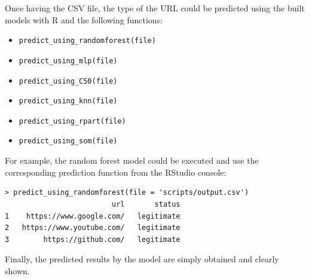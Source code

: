 \documentclass[12pt, a4paper]{article}
\begin{document}
    Once having the CSV file, the type of the URL could be predicted using the built models with R and the following functions:

    \begin{itemize}
      \item \texttt{predict\_using\_randomforest(file)}
      \item \texttt{predict\_using\_mlp(file)}
      \item \texttt{predict\_using\_C50(file)}
      \item \texttt{predict\_using\_knn(file)}
      \item \texttt{predict\_using\_rpart(file)}
      \item \texttt{predict\_using\_som(file)}
    \end{itemize}

    For example, the random forest model could be executed and use the corresponding prediction function from the RStudio console:

    \newpage

    \begin{verbatim}
> predict_using_randomforest(file = 'scripts/output.csv')
                         url       status
1    https://www.google.com/   legitimate
2   https://www.youtube.com/   legitimate
3        https://github.com/   legitimate
    \end{verbatim}

    Finally, the predicted results by the model are simply obtained and clearly shown.
\end{document}
